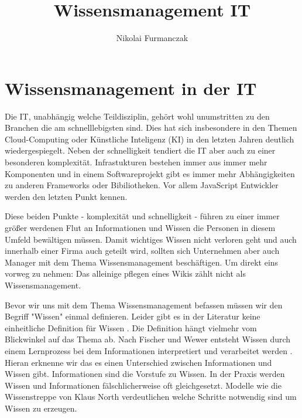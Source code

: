 \documentclass{article}
\title{Wissensmanagement IT}
\author{Nikolai Furmanczak}
\begin{document}
\section*{Wissensmanagement in der IT}
Die IT, unabhängig welche Teildisziplin, gehört wohl unumstritten zu den Branchen die am schnelllebigsten sind. Dies hat sich insbesondere in den Themen Cloud-Computing oder Künstliche Inteligenz (KI) in den letzten Jahren deutlich wiedergespiegelt. Neben der schnelligkeit tendiert die IT aber auch zu einer besonderen komplexität. Infrastukturen bestehen immer aus immer mehr Komponenten und in einem Softwareprojekt gibt es immer mehr Abhängigkeiten zu anderen Frameworks oder Bibiliotheken. Vor allem JavaScript Entwickler werden den letzten Punkt kennen. 
\par
Diese beiden Punkte - komplexität und schnelligkeit - führen zu einer immer größer werdenen Flut an Informationen und Wissen die Personen in diesem Umfeld bewältigen müssen. Damit wichtiges Wissen nicht verloren geht und auch innerhalb einer Firma auch geteilt wird, sollten sich Unternehmen aber auch Manager mit dem Thema Wissensmanagement beschäftigen. Um direkt eins vorweg zu nehmen: Das alleinige pflegen eines Wikis zählt nicht als Wissensmanagement.\par
\bigskip 
Bevor wir uns mit dem Thema Wissensmanagement befassen müssen wir den Begriff "Wissen" einmal definieren. Leider gibt es in der Literatur keine einheitliche Definition für Wissen \parencite{ReinmannRothmeierMandl2000}. Die Definition hängt vielmehr vom Blickwinkel auf das Thema ab. 
Nach Fischer und Wewer entsteht Wissen durch einem Lernprozess bei dem Informationen interpretiert und verarbeitet werden \parencite*[p. 2]{FischerWewer2021}. Hieran erknenne wir das es einen Unterschied zwischen Informationen und Wissen gibt. Informationen sind die Vorstufe zu Wissen. In der Praxis werden Wissen und Informationen fälschlicherweise oft gleichgesetzt. Modelle wie die Wissenstreppe von Klaus North verdeutlichen welche Schritte notwendig sind um Wissen zu erzeugen. 

\printbibliography
\end{document}
